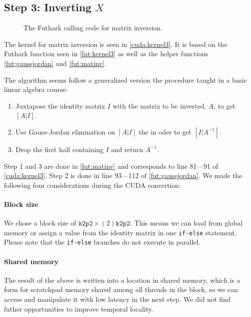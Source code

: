 \subsection{
    Step 3: Inverting \texorpdfstring{\(X\)}{X}
}

\begin{figure}[H]
    \centering
    \caption{The Futhark calling code for matrix inversion.}
    \label{fut:kernel3}
\end{figure}


The kernel for matrix inversion is seen in \autoref{cuda:kernel3}. It is based
on the Futhark function seen in \autoref{fut:kernel3} as well as the helper
functions \autoref{fut:gaussjordan} and \autoref{fut:matinv}.

The algorithm seems follow a generalized version the procedure taught in a basic
linear algebra course:

\begin{enumerate}
    \item Juxtapose the identity matrix \(I\) with the matrix to be inverted,
        \(A\), to get \([A|I]\).
    \item Use Gauss-Jordan elimination on \([A|I]\) the in oder to get
        \([I|A^{-1}]\).
    \item Drop the first half containing \(I\) and return \(A^{-1}\).
\end{enumerate}

Step 1 and 3 are done in \autoref{fut:matinv} and corresponds to line 81---91 of
\autoref{cuda:kernel3}. Step 2 is done in line 93---112 of \autoref{fut:gaussjordan}.  
We made the following four considerations during the CUDA convertion:

\paragraph{Block size}
We chose a block size of \(\texttt{k2p2} \times (2)\texttt{k2p2}\). This means
we can load from global memory or assign a value from the identity matrix in one
\texttt{if-else} statement. Please note that the \texttt{if-else} branches do
not execute in parallel.

\paragraph{Shared memory}
The result of the above is written into a location in shared memory, which is a
form for scratchpad memory shared among all threads in the block, so we can
access and manipulate it with low latency in the next step. We did not find
futher opportunities to improve temporal locality.

